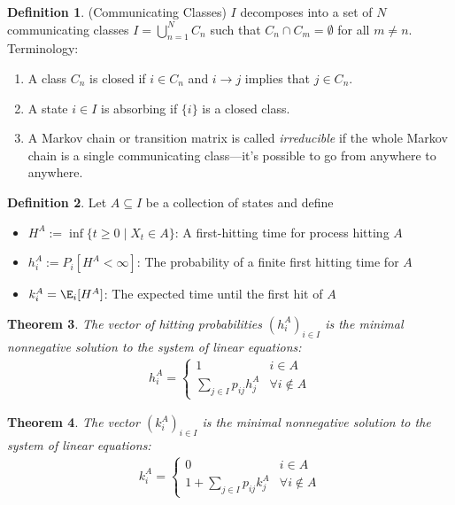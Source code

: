 \documentclass[12pt]{article}
\theoremstyle{plain}
\newtheorem{thm}{Theorem}[section]
\theoremstyle{definition}
\newtheorem{defn}[thm]{Definition}
\theoremstyle{remark}
\newcommand{\ra}{\rightarrow}
\newcommand{\nN}{_{n=1}^N}
\begin{document}
\begin{defn}(Communicating Classes)
$I$ decomposes into a set of $N$ communicating classes
$I=\bigcup\nN C_n$ such that $C_n\cap C_m=\emptyset$ for all $m\neq n$.
Terminology:
\begin{enumerate}[label=(\roman*)]
  \item A class $C_n$ is closed if $i\in C_n$ and $i\ra j$ implies that
    $j\in C_n$.
  \item A state $i \in I$ is absorbing if $\{i\}$ is a closed class.
  \item A Markov chain or transition matrix is called \emph{irreducible}
    if the whole Markov chain is a single communicating class---it's
    possible to go from anywhere to anywhere.
\end{enumerate}
\end{defn}

\begin{defn}
Let $A\subseteq I$ be a collection of states and define
\begin{itemize}
  \item $H^A:=\inf\{t\geq 0 \;|\; X_t \in A\}$: A first-hitting time for
    process hitting $A$
  \item $h^A_i:= P_i[H^A<\infty]$: The probability of a finite first
    hitting time for $A$
  \item $k_i^A=\E_i[H^A]$: The expected time until the first hit of $A$
\end{itemize}
\end{defn}

\begin{thm}
The vector of hitting probabilities $(h_i^A)_{i\in I}$ is the minimal
nonnegative solution to the system of linear equations:
\begin{align*}
  h_i^A =
  \begin{cases}
    1 & i \in A \\
    \sum_{j\in I} p_{ij} h_j^A & \forall i \not \in A
  \end{cases}
\end{align*}
\end{thm}

\begin{thm}
The vector $(k_i^A)_{i\in I}$ is the minimal nonnegative solution to the
system of linear equations:
\begin{align*}
  k_i^A =
  \begin{cases}
    0 & i \in A \\
    1 + \sum_{j\in I} p_{ij}k_j^A & \forall i \not \in A
  \end{cases}
\end{align*}
\end{thm}
\end{document}
